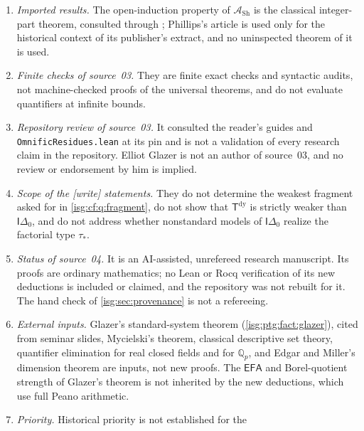 \documentclass[11pt]{article}
\theoremstyle{definition}
\theoremstyle{remark}
\newcommand{\Tdy}{\mathsf{T}^{\mathrm{dy}}}
\newcommand{\Idelta}{\mathsf{I}\Delta_0}
\newcommand{\Asc}{\mathcal{A}}
\newcommand{\Qp}{\mathbb{Q}_p}
\newcommand{\EFA}{\mathsf{EFA}}
\newcommand{\fn}[1]{\nolinkurl{#1}}
\begin{document}
\begin{enumerate}[label=\textup{(N\arabic*)},leftmargin=*]
      formula for each input sentence; it is not a single uniform truth
      predicate taking syntax codes, and there is no conflict with Tarski's
      theorem. It needs an actually positive infinite bound; no computable
      test for infinitude is asserted; effective presentations are needed
      only for the upper reductions.
\item \emph{Imported results.} The open-induction property of
      $\Asc_{\mathrm{Sh}}$ is the classical integer-part theorem, consulted
      through \cite{Raffer}; Phillips's article is used only for the
      historical context of its publisher's extract, and no uninspected
      theorem of it is used.
\item \emph{Finite checks of source~03.} They are finite exact checks and
      syntactic audits, not machine-checked proofs of the universal
      theorems, and do not evaluate quantifiers at infinite bounds.
\item \emph{Repository review of source~03.} It consulted the reader's
      guides and \fn{OmnificResidues.lean} at its pin and is not a
      validation of every research claim in the repository. Elliot Glazer
      is not an author of source~03, and no review or endorsement by him is
      implied.
\item \emph{Scope of the \textup{[write]} statements.} They do not
      determine the weakest fragment asked for in \cref{isg:cf:q:fragment},
      do not show that $\Tdy$ is strictly weaker than $\Idelta$, and do not
      address whether nonstandard models of $\Idelta$ realize the
      factorial type $\tau_*$.
\item \emph{Status of source~04.} It is an AI-assisted, unrefereed research
      manuscript. Its proofs are ordinary mathematics; no Lean or Rocq
      verification of its new deductions is included or claimed, and the
      repository was not rebuilt for it. The hand check of
      \cref{isg:sec:provenance} is not a refereeing.
\item \emph{External inputs.} Glazer's standard-system theorem
      (\cref{isg:ptg:fact:glazer}), cited from seminar slides,
      Mycielski's theorem, classical descriptive set theory, quantifier
      elimination for real closed fields and for $\Qp$, and Edgar and
      Miller's dimension theorem are inputs, not new proofs. The $\EFA$
      and Borel-quotient strength of Glazer's theorem is not inherited by
      the new deductions, which use full Peano arithmetic.
\item \emph{Priority.} Historical priority is not established for the

\end{enumerate}
\end{document}
